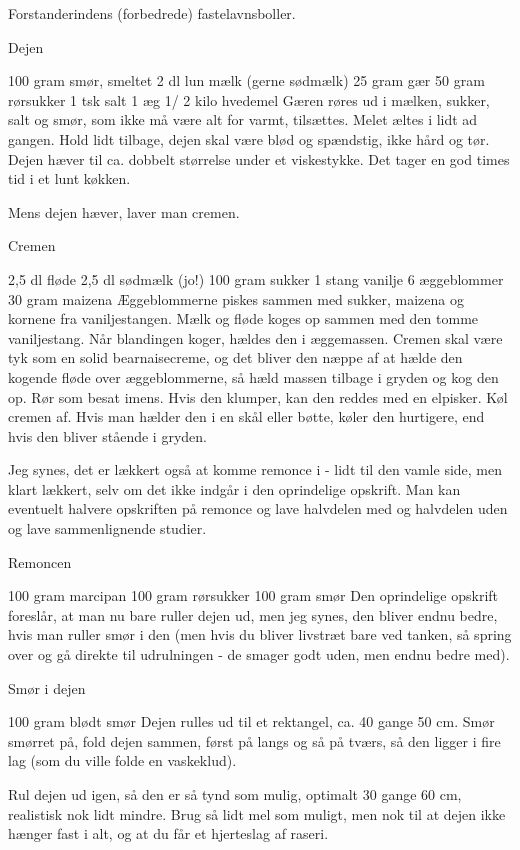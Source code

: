 \documentclass[
  letterpaper,
  DIV=11,
  numbers=noendperiod]{scrreprt}
\begin{document}
Forstanderindens (forbedrede) fastelavnsboller.

Dejen

100 gram smør, smeltet 2 dl lun mælk (gerne sødmælk) 25 gram gær 50 gram
rørsukker 1 tsk salt 1 æg 1/ 2 kilo hvedemel Gæren røres ud i mælken,
sukker, salt og smør, som ikke må være alt for varmt, tilsættes. Melet
æltes i lidt ad gangen. Hold lidt tilbage, dejen skal være blød og
spændstig, ikke hård og tør. Dejen hæver til ca. dobbelt størrelse under
et viskestykke. Det tager en god times tid i et lunt køkken.

Mens dejen hæver, laver man cremen.

Cremen

2,5 dl fløde 2,5 dl sødmælk (jo!) 100 gram sukker 1 stang vanilje 6
æggeblommer 30 gram maizena Æggeblommerne piskes sammen med sukker,
maizena og kornene fra vaniljestangen. Mælk og fløde koges op sammen med
den tomme vaniljestang. Når blandingen koger, hældes den i æggemassen.
Cremen skal være tyk som en solid bearnaisecreme, og det bliver den
næppe af at hælde den kogende fløde over æggeblommerne, så hæld massen
tilbage i gryden og kog den op. Rør som besat imens. Hvis den klumper,
kan den reddes med en elpisker. Køl cremen af. Hvis man hælder den i en
skål eller bøtte, køler den hurtigere, end hvis den bliver stående i
gryden.

Jeg synes, det er lækkert også at komme remonce i - lidt til den vamle
side, men klart lækkert, selv om det ikke indgår i den oprindelige
opskrift. Man kan eventuelt halvere opskriften på remonce og lave
halvdelen med og halvdelen uden og lave sammenlignende studier.

Remoncen

100 gram marcipan 100 gram rørsukker 100 gram smør Den oprindelige
opskrift foreslår, at man nu bare ruller dejen ud, men jeg synes, den
bliver endnu bedre, hvis man ruller smør i den (men hvis du bliver
livstræt bare ved tanken, så spring over og gå direkte til udrulningen -
de smager godt uden, men endnu bedre med).

Smør i dejen

100 gram blødt smør Dejen rulles ud til et rektangel, ca. 40 gange 50
cm. Smør smørret på, fold dejen sammen, først på langs og så på tværs,
så den ligger i fire lag (som du ville folde en vaskeklud).

Rul dejen ud igen, så den er så tynd som mulig, optimalt 30 gange 60 cm,
realistisk nok lidt mindre. Brug så lidt mel som muligt, men nok til at
dejen ikke hænger fast i alt, og at du får et hjerteslag af raseri.
\end{document}
